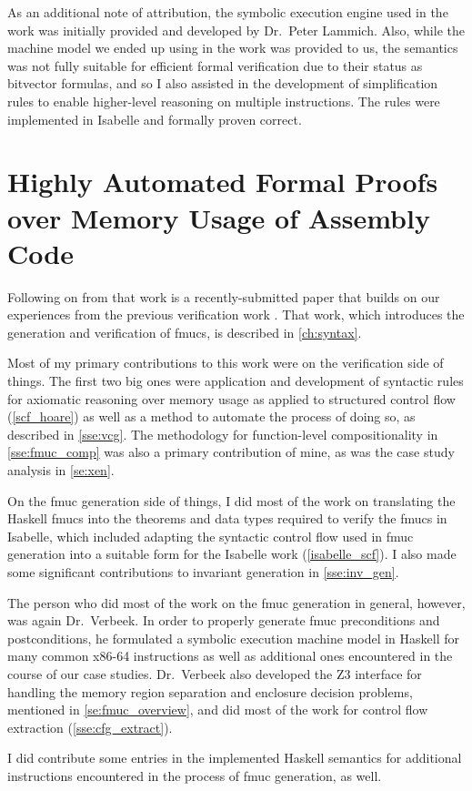As an additional note of attribution, the symbolic execution engine
used in the work was initially provided and developed by Dr.~Peter Lammich.
Also, while the machine model we ended up using in the work was provided to us,
the semantics was not fully suitable for efficient formal verification
due to their status as bitvector formulas,
and so I also assisted in the development of simplification rules
to enable higher-level reasoning on multiple instructions.
The rules were implemented in Isabelle and formally proven correct.

\section*{Highly Automated Formal Proofs over Memory Usage of Assembly Code}
\label{attribute2}
Following on from that work is a recently-submitted paper
that builds on our experiences from the previous verification
work \autocite{popl2019underreview}. That work,
which introduces the generation and verification of
\acp{fmuc}, is described in \cref{ch:syntax}.

Most of my primary contributions to this work were on the verification side of things.
The first two big ones were application and development of syntactic rules
for axiomatic reasoning over memory usage
as applied to structured control flow (\cref{scf_hoare})
as well as a method to automate the process of doing so, 
as described in \cref{sse:vcg}.
The methodology for function-level compositionality in \cref{sse:fmuc_comp}
was also a primary contribution of mine,
as was the case study analysis in \cref{se:xen}.

On the \ac{fmuc} generation side of things,
I did most of the work on translating the Haskell \acp{fmuc}
into the theorems and data types required to verify the \acp{fmuc} in Isabelle,
which included adapting the syntactic control flow used in \ac{fmuc} generation
into a suitable form for the Isabelle work (\cref{isabelle_scf}).
I also made some significant contributions to invariant generation in \cref{sse:inv_gen}.

The person who did most of the work on the \ac{fmuc} generation in general,
however, was again Dr.~Verbeek.
In order to properly generate \ac{fmuc} preconditions and postconditions,
he formulated a symbolic execution machine model in Haskell
for many common x86-64 instructions
as well as additional ones encountered in the course of our case studies.
Dr.~Verbeek also developed the Z3 interface
for handling the memory region separation and enclosure decision problems,
mentioned in \cref{se:fmuc_overview},
and did most of the work for control flow extraction (\cref{sse:cfg_extract}).

I did contribute some entries in the implemented Haskell semantics
for additional instructions encountered in the process of \ac{fmuc} generation,
as well.
